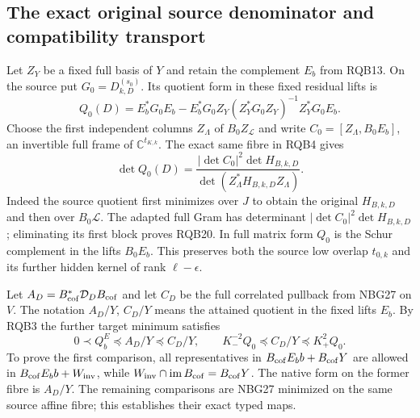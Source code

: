 \documentclass[11pt,a4paper]{article}
\begin{document}
\subsection{The exact original source denominator and compatibility transport}

Let $Z_Y$ be a fixed full basis of $Y$ and retain the complement
$E_b$ from RQB13. On the source put $G_0=D_{k,D}^{(s_0)}$.
Its quotient form in these fixed residual lifts is
\[
 Q_0(D)=E_b^*G_0E_b
 -E_b^*G_0Z_Y(Z_Y^*G_0Z_Y)^{-1}Z_Y^*G_0E_b .
 \tag{RQB19}
\]
Choose the first independent columns $Z_\Lambda$ of
$B_0Z_{\mathscr L}$ and write
$C_0=[Z_\Lambda,B_0E_b]$, an invertible full frame of
$\mathbb C^{t_{K,k}}$. The exact same fibre in RQB4 gives
\[
 \det Q_0(D)=
 \frac{|\det C_0|^2\det H_{B,k,D}}
      {\det(Z_\Lambda^*H_{B,k,D}Z_\Lambda)} .
 \tag{RQB20}
\]
Indeed the source quotient first minimizes over $J$ to obtain
the original $H_{B,k,D}$ and then over $B_0\mathscr L$.
The adapted full Gram has determinant
$|\det C_0|^2\det H_{B,k,D}$; eliminating its first block proves
RQB20. In full matrix form $Q_0$ is the Schur complement in the
lifts $B_0E_b$. This preserves both the source low overlap
$t_{0,k}$ and its further hidden kernel of rank $\ell-\epsilon$.

Let $A_D=B_{\rm cof}^*\mathcal D_D B_{\rm cof}$ and let $C_D$
be the full correlated pullback from NBG27 on $V$.
The notation $A_D/Y$, $C_D/Y$ means the attained quotient in
the fixed lifts $E_b$. By RQB3 the further target minimum
satisfies
\[
 0\prec Q_b^E\preceq A_D/Y\preceq C_D/Y,\qquad
 K_-^{-2}Q_0\preceq C_D/Y\preceq K_+^2Q_0 .
 \tag{RQB21}
\]
To prove the first comparison, all representatives in
$B_{\rm cof}E_bb+B_{\rm cof}Y$ are allowed in
$B_{\rm cof}E_bb+W_{\rm inv}$, while
$W_{\rm inv}\cap\operatorname{im}B_{\rm cof}=B_{\rm cof}Y$.
The native form on the former fibre is $A_D/Y$.
The remaining comparisons are NBG27 minimized on the same
source affine fibre; this establishes their exact typed maps.
\end{document}

